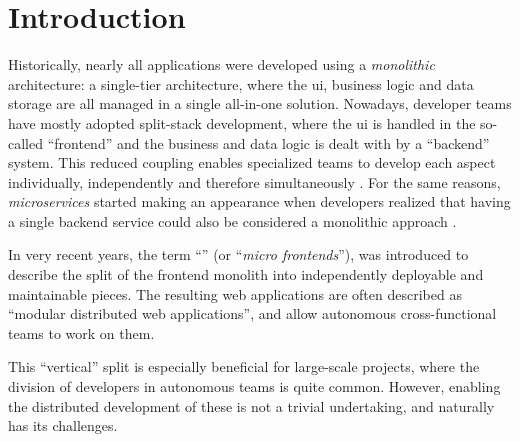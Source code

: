 
\chapter{Introduction}
\label{ch:introduction}




Historically, nearly all applications were developed using a
\textit{\gls{monolithic}} architecture: a single-tier architecture, where the
\gls{ui}, business logic and data storage are all managed in a single all-in-one
solution. Nowadays, developer teams have mostly adopted split-stack development,
where the \gls{ui} is handled in the so-called ``\gls{frontend}'' and the
business and data logic is dealt with by a ``\gls{backend}'' system. This
reduced coupling enables specialized teams to develop each aspect individually,
independently and therefore simultaneously \autocite{Dunkley_2016}. For the same
reasons, \textit{microservices} started making an appearance when developers
realized that having a single \gls{backend} service could also be considered a
monolithic approach \autocite{Fowler_Microservices_2014}.

In very recent years, the term ``\textit{}'' (or
``\textit{micro frontends}''), was introduced to describe the split of the
\gls{frontend} \gls{monolith} into independently deployable and maintainable pieces.
The resulting web applications are often described as ``modular distributed web
applications'', and allow autonomous cross-functional teams to work on them.

This ``vertical'' split is especially beneficial for large-scale projects, where
the division of developers in autonomous teams is quite common. However,
enabling the distributed development of these  is not a
trivial undertaking, and naturally has its challenges.

